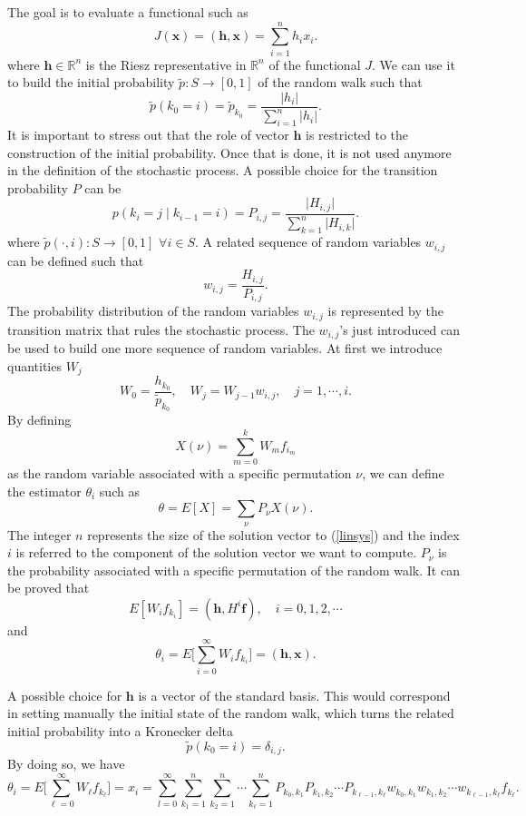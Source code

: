 \documentclass[a4paper,10pt]{article}
\begin{document}
The goal is to evaluate a functional such as
\[
J(\mathbf{x})=(\mathbf{h},\mathbf{x})=\sum_{i=1}^n h_i x_i.
\]
where $\mathbf{h}\in \mathbb{R}^n$ is the Riesz representative in
$\mathbb{R}^n$ of the functional $J$.
We can use it to build the initial probability $\tilde{p}:
S\rightarrow [0,1]$ of the random walk such that
\[
\tilde{p}(k_0=i)=\tilde{p}_{k_0}=\frac{\lvert h_i\rvert}{\sum_{i=1}^n \lvert
h_i\rvert}.
\]
It is important to stress out that the role of vector $\mathbf{h}$ is
restricted to the construction of the initial probability. Once that is done,
it is
not used anymore in the definition of the stochastic process.
A possible choice for the transition probability $P$ can be
\[
p(k_i=j \;\lvert\;k_{i-1}=i )=P_{i,j}=\frac{\lvert H_{i,j}\rvert}{\sum_{k=1}^n
\lvert H_{i,k}\rvert}.
\]
where $\tilde{p}(\cdot,i):S\rightarrow [0,1]$ $\forall i\in S$.
A related sequence of random variables $w_{i,j}$ can be defined
such that
\[
w_{i,j}=\frac{H_{i,j}}{P_{i,j}}.
\]
The probability distribution of the random variables $w_{i,j}$ is represented
by the transition matrix that rules the stochastic process. The $w_{i,j}$'s
just introduced can be used to build one more sequence
of random variables.
At first we introduce quantities $W_j$
\[
W_{0}=\frac{h_{k_0}}{\tilde{p}_{k_0}}, \quad W_j=W_{j-1} w_{i,j}, \quad
j=1,\cdots, i.
\]
By defining
\[
X(\nu)=\sum_{m=0}^k W_m f_{i_m}
\]
as the random variable associated with a specific permutation $\nu$, we can
define the estimator $\theta_i$ such as
\[
\theta=E[X]=\sum_{\nu}P_{\nu}X(\nu).
\]
The integer $n$ represents the size of the solution vector to (\ref{linsys})
and
the
index
$i$
is referred to the component of the solution vector we want to compute.
$P_{\nu}$ is the probability associated with a specific permutation of the
random walk.
It can be proved that
\[
E[W_i f_{k_i}]=(\mathbf{h},H^i\mathbf{f}), \quad i=0,1,2,\cdots
\]
and
\[
\theta_i=E\bigg[\sum_{i=0}^\infty W_i f_{k_i}\bigg]=(\mathbf{h},\mathbf{x}).
\]

A possible choice for $\mathbf{h}$ is a vector of the standard basis. This
would correspond in setting manually the initial state of the random walk,
which turns the related initial probability into a Kronecker delta
\[
\tilde{p}(k_0=i)=\delta_{i,j}.
\]
By doing so, we have
\begin{equation}
\theta_i=E\bigg[\sum_{\ell=0}^\infty W_{\ell}
f_{k_{\ell}}\bigg]=x_i=\sum_{l=0}^\infty
\sum_{k_1=1}^{n}\sum_{k_2=1}^n\cdots \sum_{k_{\ell}=1}^n
P_{k_0,k_1}P_{k_1,k_2}\cdots P_{k_{\ell-1},
k_{\ell}}w_{k_0,k_1}w_{k_1,k_2}\cdots
w_{k_{\ell-1}, k_{\ell}}f_{k_{\ell}}.
\label{dir_mean}
\end{equation}
\end{document}
